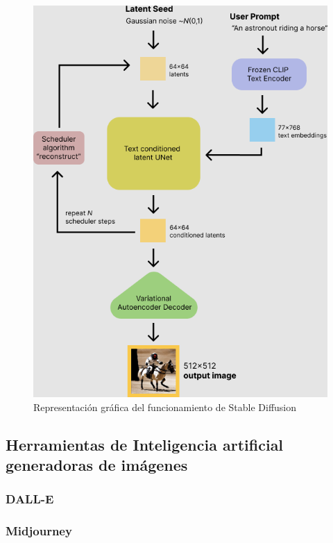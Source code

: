 \begin{figure}[!hbt]
	\centering
	\includegraphics[width = 0.9
	\textwidth]{Imagenes/Vectorial/representacionvisualSD.png}
	\caption{Representación gráfica del funcionamiento de Stable Diffusion}
	\label{fig:sd}
\end{figure}

\subsection{Herramientas de Inteligencia artificial generadoras de imágenes}

\subsubsection{DALL-E}


\subsubsection{Midjourney}